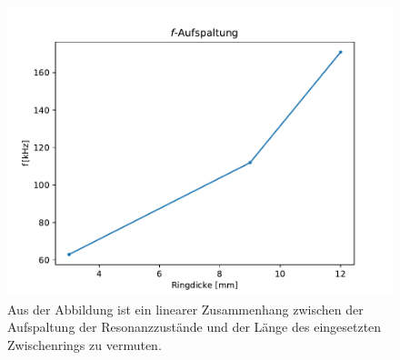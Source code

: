            \begin{figure}[ht]
                \centering
                \includegraphics[scale=0.6]{./pictures/f_Aufspaltung.pdf}
                \caption{Aus der Abbildung ist ein linearer Zusammenhang zwischen der Aufspaltung der Resonanzzustände und der Länge des eingesetzten Zwischenrings zu vermuten.}
                \label{fig:f_Aufspaltung}
            \end{figure}
        \newpage
